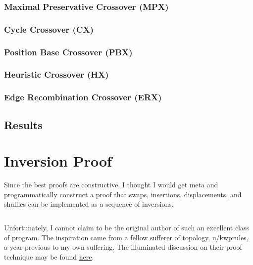 \documentclass{article}
\begin{document}
\subsubsection{Maximal Preservative Crossover (MPX)}
\subsubsection{Cycle Crossover (CX)}
\subsubsection{Position Base Crossover (PBX)}
\subsubsection{Heuristic Crossover (HX)}
\subsubsection{Edge Recombination Crossover (ERX)}

\subsection{Results}

\appendix\appendixpage{}\addappheadtotoc{}
\section{Inversion Proof}\label{app:proof}

Since the best proofs are constructive, I thought I would get meta and programmatically construct a
proof that swaps, insertions, displacements, and shuffles can be implemented as a sequence of
inversions.

\inputminted{python}{proof.py}

Unfortunately, I cannot claim to be the original author of such an excellent class of program. The
inspiration came from a fellow sufferer of topology,
\href{https://www.reddit.com/user/kwprules}{u/kwprules}, a year previous to my own suffering. The
illuminated discussion on their proof technique may be found
\href{https://www.reddit.com/r/math/comments/7gqhlc/what\_to\_say\_instead\_of\_trivially/}{here}.


{}
\end{document}
